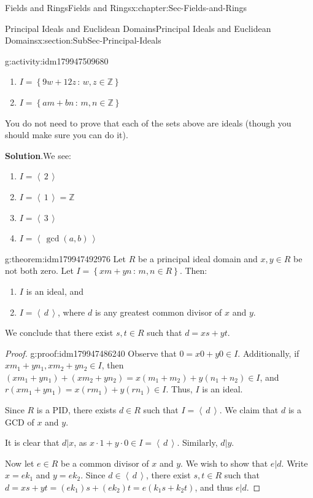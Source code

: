 \documentclass[oneside,10pt,]{book}
\newcommand{\blocktitlefont}{\relax}
\numberwithin{equation}{section}
\newcommand{\ideal}[1]{\left\langle\, #1 \,\right\rangle}
\newcommand{\setof}[2]{{\left\{#1\,\colon\,#2\right\}}}
\def\Z{{\mathbb Z}}
\begin{document}
\begin{chapterptx}{Fields and Rings}{}{Fields and Rings}{}{}{x:chapter:Sec-Fields-and-Rings}
\begin{sectionptx}{Principal Ideals and Euclidean Domains}{}{Principal Ideals and Euclidean Domains}{}{}{x:section:SubSec-Principal-Ideals}
\begin{activity}{}{g:activity:idm179947509680}
\begin{enumerate}
\item{}\(I = \setof{9w+12z}{w,z\in\Z}\)%
\item{}\(I = \setof{am+bn}{m,n\in\Z}\)%
\end{enumerate}
%
\par
You do not need to prove that each of the sets above are ideals (though you should make sure you can do it).%
\par\smallskip%
\noindent\textbf{\blocktitlefont Solution}.\hypertarget{g:solution:idm179947498192}{}\quad{}We see:%
\begin{enumerate}
\item{}\(I= \ideal{2}\)%
\item{}\(I = \ideal{1} = \Z\)%
\item{}\(I = \ideal{3}\)%
\item{}\(I = \ideal{\gcd(a,b)}\)%
\end{enumerate}
%
\end{activity}
\begin{theorem}{}{}{g:theorem:idm179947492976}%
Let \(R\) be a principal ideal domain and \(x,y\in R\) be not both zero. Let \(I = \setof{xm+yn}{m,n\in R}\). Then:%
\begin{enumerate}
\item{}\(I\) is an ideal, and%
\item{}\(I = \ideal{d}\), where \(d\) is any greatest common divisor of \(x\) and \(y\).%
\end{enumerate}
%
\par
We conclude that there exist \(s,t\in R\) such that \(d = xs + yt\).%
\end{theorem}
\begin{proof}{}{g:proof:idm179947486240}
Observe that \(0 = x0 + y0 \in I\). Additionally, if \(x m_1 + y n_1, x m_2 + y n_2\in I\), then \((x m_1 + y n_1) + (x m_2 + y n_2) = x (m_1 + m_2) + y (n_1 + n_2) \in I\), and \(r(x m_1 + y n_1) = x (rm_1) + y(rn_1) \in I\). Thus, \(I\) is an ideal.%
\par
Since \(R\) is a PID, there exists \(d\in R\) such that \(I = \ideal{d}\). We claim that \(d\) is a GCD of \(x\) and \(y\).%
\par
It is clear that \(d|x\), as \(x\cdot 1 + y\cdot 0\in I = \ideal{d}\). Similarly, \(d|y\).%
\par
Now let \(e\in R\) be a common divisor of \(x\) and \(y\). We wish to show that \(e|d\). Write \(x = e k_1\) and \(y = e k_2\). Since \(d\in \ideal{d}\), there exist \(s,t\in R\) such that \(d = x s + yt = (e k_1) s + (e k_2)t = e(k_1 s + k_2 t)\), and thus \(e|d\).%

\end{proof}
\end{sectionptx}
\end{chapterptx}
\end{document}
